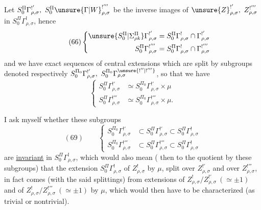 Let $S_0^\Pi\Gamma^{!'}_{\rho,\sigma},\ S_0^\Pi\unsure{\Gamma|W}^{!'''}_{\rho,\sigma}$\unsure{)|]}
be the inverse images of $\unsure{Z}^{!'}_{\rho,\sigma},\ Z^{!'''}_{\rho,\sigma}$
in $S_0^\Pi\Gamma^!_{\rho,\sigma}$, hence
\[
\tag{66}
\left\{
\begin{aligned}
\unsure{S_0^\Pi|\Sigma_{\rho k}^{\Pi}}\Gamma^{!'}_{\rho,\sigma}
&=S_0^\Pi\Gamma^!_{\rho,\sigma}\cap\Gamma^{!'}_{\rho,\sigma}\\
S_0^\Pi\Gamma^{!'''}_{\rho,\sigma}
&=S_0^\Pi\Gamma^!_{\rho,\sigma}\cap\Gamma^{!'''}_{\rho,\sigma}
\end{aligned}
\right.
\]
and we have exact sequences of central extensions
which are split by subgroups denoted respectively
$S_0^{\Pi_0}\Gamma^{!'}_{\rho,\sigma},\ S_0^{\Pi_0}\Gamma^{\unsure{!''|!'''}}_{\rho,\sigma}$,
so that we have
\[
\tag{68}
\left\{
\begin{aligned}
S_0^\Pi\Gamma^{!'}_{\rho,\sigma}
&\simeq S_0^{\Pi_0}\Gamma^{!'}_{\rho,\sigma}\times\mu\\
S_0^\Pi\Gamma^{!'''}_{\rho,\sigma}
&\simeq S_0^{\Pi_0}\Gamma^{!'''}_{\rho,\sigma}\times\mu.
\end{aligned}
\right.
\]


I ask myself whether these subgroups
\[
(69)\qquad
\left\{
\begin{aligned}
S_0^{\Pi_0}\Gamma_{\rho,\sigma}^{!'}&\subset S_0^{\Pi}\Gamma_{\rho,\sigma}^{!'}\subset S_0^{\Pi}\Gamma_{\rho,\sigma}^{!}\\
S_0^{\Pi_0}\Gamma_{\rho,\sigma}^{!'''}&\subset S_0^{\Pi}\Gamma_{\rho,\sigma}^{!'''}\subset S_0^{\Pi}\Gamma_{\rho,\sigma}^{!}
\end{aligned}
\right.
\]
are \uline{invariant} in $S_0^{\Pi}\Gamma_{\rho,\sigma}^{!}$, which
would also mean ( then to the quotient by these subgroups)
that the extension $S_0^{\Pi}\Gamma_{\rho,\sigma}^{!}$ of $Z_{\rho,\sigma}^{!}$
by $\mu$, split over $Z_{\rho,\sigma}^{!'}$ and over $Z_{\rho,\sigma}^{!'''}$,
in fact comes (with the said splittings) from extensions of
$Z_{\rho,\sigma}^{!}/Z_{\rho,\sigma}^{!'}\ (\simeq\pm1)$ and of
$Z_{\rho,\sigma}^{!}/Z_{\rho,\sigma}^{!'''}\ (\simeq\pm1)$ by $\mu$,
which would then have to be characterized (as trivial or nontrivial).

